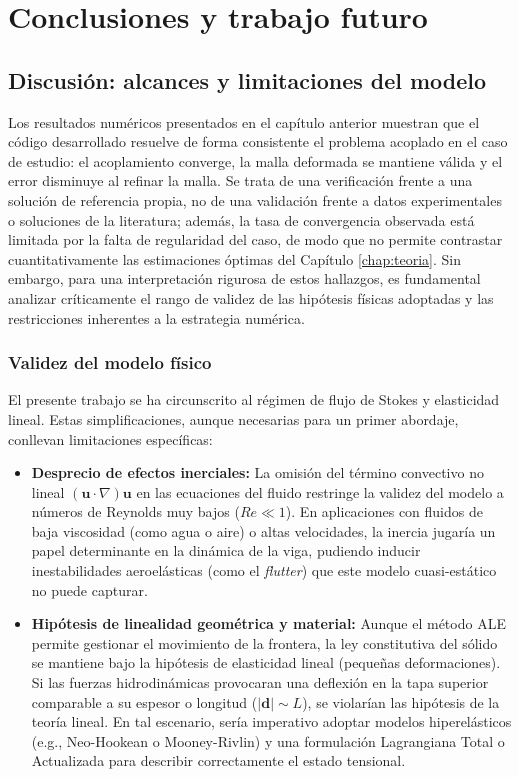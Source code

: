\documentclass[12pt, letterpaper]{report}
\theoremstyle{definition}
\begin{document}
\chapter{Conclusiones y trabajo futuro}

\section{Discusión: alcances y limitaciones del modelo}

Los resultados numéricos presentados en el capítulo anterior muestran que el código desarrollado resuelve de forma consistente el problema acoplado en el caso de estudio: el acoplamiento converge, la malla deformada se mantiene válida y el error disminuye al refinar la malla. Se trata de una verificación frente a una solución de referencia propia, no de una validación frente a datos experimentales o soluciones de la literatura; además, la tasa de convergencia observada está limitada por la falta de regularidad del caso, de modo que no permite contrastar cuantitativamente las estimaciones óptimas del Capítulo \ref{chap:teoria}. Sin embargo, para una interpretación rigurosa de estos hallazgos, es fundamental analizar críticamente el rango de validez de las hipótesis físicas adoptadas y las restricciones inherentes a la estrategia numérica.

\subsection{Validez del modelo físico}

El presente trabajo se ha circunscrito al régimen de flujo de Stokes y elasticidad lineal. Estas simplificaciones, aunque necesarias para un primer abordaje, conllevan limitaciones específicas:

\begin{itemize}
    \item \textbf{Desprecio de efectos inerciales:} La omisión del término convectivo no lineal $(\mathbf{u} \cdot \nabla)\mathbf{u}$ en las ecuaciones del fluido restringe la validez del modelo a números de Reynolds muy bajos ($Re \ll 1$). En aplicaciones con fluidos de baja viscosidad (como agua o aire) o altas velocidades, la inercia jugaría un papel determinante en la dinámica de la viga, pudiendo inducir inestabilidades aeroelásticas (como el \textit{flutter}) que este modelo cuasi-estático no puede capturar.
    
    \item \textbf{Hipótesis de linealidad geométrica y material:} Aunque el método ALE permite gestionar el movimiento de la frontera, la ley constitutiva del sólido se mantiene bajo la hipótesis de elasticidad lineal (pequeñas deformaciones). Si las fuerzas hidrodinámicas provocaran una deflexión en la tapa superior comparable a su espesor o longitud ($|\mathbf{d}| \sim L$), se violarían las hipótesis de la teoría lineal. En tal escenario, sería imperativo adoptar modelos hiperelásticos (e.g., Neo-Hookean o Mooney-Rivlin) y una formulación Lagrangiana Total o Actualizada para describir correctamente el estado tensional.
\end{itemize}
\end{document}
